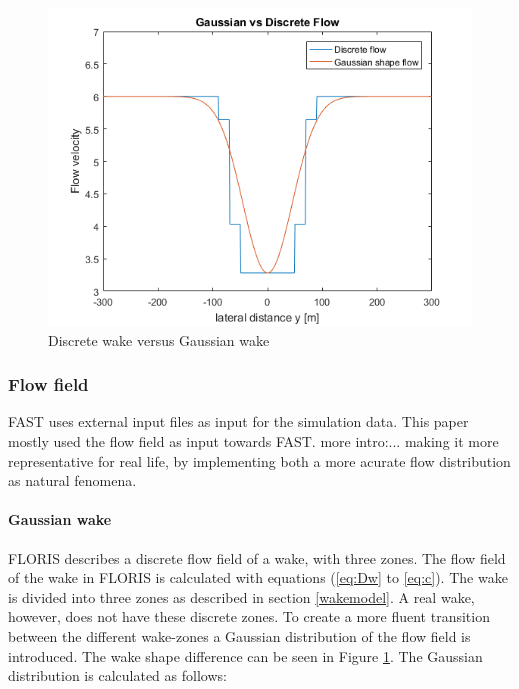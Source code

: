 \begin{figure}
  \includegraphics[width=\linewidth]{./Figures/PlotGausDiscWakeDWake180U6yaw0.png} %
  \caption{Discrete wake versus Gaussian wake} %
  \label{fig:disgaus}
\end{figure}


\subsubsection{Flow field}
FAST uses external input files as input for the simulation data. This paper mostly used the flow field as input towards FAST. 
more intro:... making it more representative for real life, by implementing both a more acurate flow distribution as natural fenomena.

\paragraph{Gaussian wake}
FLORIS describes a discrete flow field of a wake, with three zones. The flow field of the wake in FLORIS is calculated with equations (\ref{eq:Dw} to \ref{eq:c}). The wake is divided into three zones as described in section \ref{wakemodel}. A real wake, however, does not have these discrete zones. To create a more fluent transition between the different wake-zones a Gaussian distribution of the flow field is introduced\cite{Bastankhah2016}. The wake shape difference can be seen in Figure \ref{fig:disgaus}.  The Gaussian distribution is calculated as follows: 

